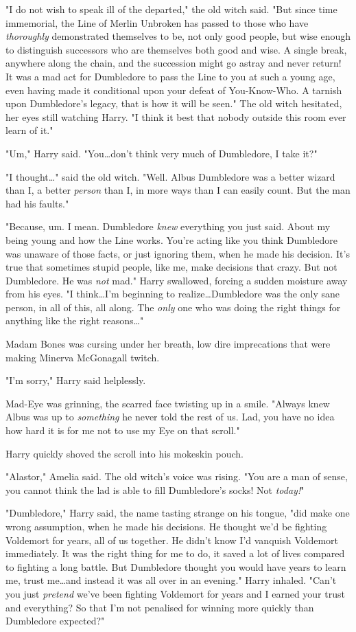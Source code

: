 "I do not wish to speak ill of the departed," the old witch said. "But since
time immemorial, the Line of Merlin Unbroken has passed to those who have
\emph{thoroughly} demonstrated themselves to be, not only good people, but wise
enough to distinguish successors who are themselves both good and wise. A
single break, anywhere along the chain, and the succession might go astray and
never return! It was a mad act for Dumbledore to pass the Line to you at such a
young age, even having made it conditional upon your defeat of You-Know-Who. A
tarnish upon Dumbledore's legacy, that is how it will be seen." The old witch
hesitated, her eyes still watching Harry. "I think it best that nobody outside
this room ever learn of it."

"Um," Harry said. "You…don't think very much of Dumbledore, I take it?"

"I thought…" said the old witch. "Well. Albus Dumbledore was a better
wizard than I, a better \emph{person} than I, in more ways than I can easily
count. But the man had his faults."

"Because, um. I mean. Dumbledore \emph{knew} everything you just said. About my
being young and how the Line works. You're acting like you think Dumbledore was
unaware of those facts, or just ignoring them, when he made his decision. It's
true that sometimes stupid people, like me, make decisions that crazy. But not
Dumbledore. He was \emph{not} mad." Harry swallowed, forcing a sudden moisture
away from his eyes. "I think…I'm beginning to realize…Dumbledore
was the only sane person, in all of this, all along. The \emph{only}
one who was doing the right things for anything like the right reasons…"

Madam Bones was cursing under her breath, low dire imprecations that were
making Minerva McGonagall twitch.

"I'm sorry," Harry said helplessly.

Mad-Eye was grinning, the scarred face twisting up in a smile. "Always knew
Albus was up to \emph{something} he never told the rest of us. Lad, you have no
idea how hard it is for me not to use my Eye on that scroll."

Harry quickly shoved the scroll into his mokeskin pouch.

"Alastor," Amelia said. The old witch's voice was rising. "You are a man of
sense, you cannot think the lad is able to fill Dumbledore's socks! Not
\emph{today!}"

"Dumbledore," Harry said, the name tasting strange on his tongue, "did make one
wrong assumption, when he made his decisions. He thought we'd be fighting
Voldemort for years, all of us together. He didn't know I'd vanquish Voldemort
immediately. It was the right thing for me to do, it saved a lot of lives
compared to fighting a long battle. But Dumbledore thought you would have years
to learn me, trust me…and instead it was all over in an evening." Harry
inhaled. "Can't you just \emph{pretend} we've been fighting Voldemort for years
and I earned your trust and everything? So that I'm not penalised for winning
more quickly than Dumbledore expected?"

